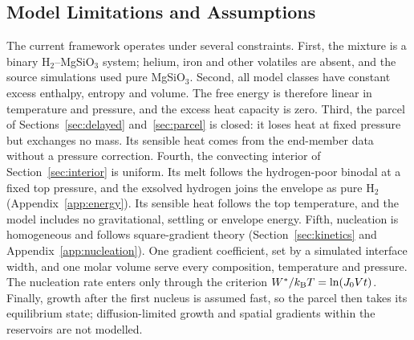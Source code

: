 \subsection{Model Limitations and Assumptions}

The current framework operates under several constraints. First, the mixture is a binary
H$_2$--MgSiO$_3$ system; helium, iron and other volatiles are absent, and the source
simulations used pure MgSiO$_3$. Second, all model classes have constant excess enthalpy,
entropy and volume. The free energy is therefore linear in temperature and pressure, and the
excess heat capacity is zero. Third, the parcel of Sections~\ref{sec:delayed}
and~\ref{sec:parcel} is closed: it loses heat at fixed pressure but exchanges no mass. Its
sensible heat comes from the end-member data without a pressure correction. Fourth, the
convecting interior of Section~\ref{sec:interior} is uniform. Its melt follows the
hydrogen-poor binodal at a fixed top pressure, and the exsolved hydrogen joins the envelope as
pure H$_2$ (Appendix~\ref{app:energy}). Its sensible heat follows the top temperature, and the
model includes no gravitational, settling or envelope energy. Fifth, nucleation is homogeneous
and follows square-gradient theory (Section~\ref{sec:kinetics} and
Appendix~\ref{app:nucleation}). One gradient coefficient, set by a simulated interface width,
and one molar volume serve every composition, temperature and pressure. The nucleation rate
enters only through the criterion $W^*/k_{\rm B}T = \ln(J_0 V t)$. Finally, growth after the
first nucleus is assumed fast, so the parcel then takes its equilibrium state; diffusion-limited
growth and spatial gradients within the reservoirs are not modelled.
